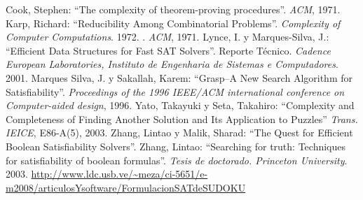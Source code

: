 \documentclass[12pt,lettersize,oneside]{article}
\begin{document}
\begin{thebibliography}{99}
Cook, Stephen: ``The complexity of theorem-proving
  procedures''. \emph{ACM}, 1971.
Karp, Richard: ``Reducibility Among Combinatorial
  Problems''. \emph{Complexity of Computer Computations}. 1972.
  . \emph{ACM}, 1971.
Lynce, I. y Marques-Silva, J.: ``Efficient Data Structures for
  Fast SAT Solvers''. Reporte Técnico. \emph{Cadence European Laboratories,
    Instituto de Engenharia de Sistemas e Computadores}. 2001.
Marques Silva, J. y Sakallah, Karem: ``Grasp--A New Search
  Algorithm for Satisfiability''. \emph{Proceedings of the 1996 IEEE/ACM
    international conference on Computer-aided design}, 1996.
Yato, Takayuki y Seta, Takahiro: ``Complexity and Completeness
  of Finding Another Solution and Its Application to Puzzles''  \emph{Trans. IEICE}, E86-A(5), 2003.
Zhang, Lintao y Malik, Sharad: ``The Quest for Efficient Boolean
  Satisfiability Solvers''.
Zhang, Lintao: ``Searching for truth: Techniques for
  satisfiability of boolean formulas''. \emph{Tesis de doctorado. Princeton
    University}. 2003.
\url{http://www.ldc.usb.ve/~meza/ci-5651/e-m2008/articulosYsoftware/FormulacionSATdeSUDOKU}
\end{thebibliography}
\end{document}
